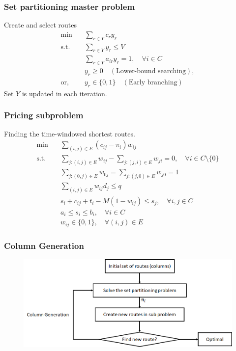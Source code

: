 \documentclass[10pt]{beamer}
\begin{document}
	\begin{frame}
		\frametitle{Set partitioning master problem}
		Create and select routes
		\begin{align*}
			\min \quad & \sum_{r \in Y} c_r y_r\\
			\text{s.t.} \quad & \sum_{r \in Y} y_r \le V\\
			& \sum_{r \in Y} a_{ir} y_r = 1, \quad \forall i \in C\\
			& y_r \ge 0 \quad (\text{Lower-bound searching}), \\
			\text{or}, \quad & y_r \in \{0, 1\} \quad (\text{Early branching})
		\end{align*}
		Set $Y$ is updated in each iteration.
	\end{frame}

	\begin{frame}
		\frametitle{Pricing subproblem}
		Finding the time-windowed shortest routes.
		\begin{align*}
			\min \quad & \sum_{(i, j) \in E} (c_{ij} - \pi_i) w_{ij}\\
			\text{s.t.} \quad & \sum_{j: (i, j) \in E} w_{ij} - \sum_{j:(j, i)\in E} w_{ji} = 0, \quad \forall i \in C \setminus \{0\}\\
			& \sum_{j: (0, j) \in E} w_{0j} = \sum_{j: (j, 0) \in E} w_{j0} = 1\\
			& \sum_{(i, j) \in E} w_{ij} d_{j} \le q \\
			& s_i + c_{ij} + t_i - M(1 - w_{ij}) \le s_j, \quad \forall i, j \in C\\
			& a_i \le s_i \le b_i, \quad \forall i \in C\\
			& w_{ij} \in \{0, 1\}, \quad \forall (i, j) \in E
		\end{align*}
	\end{frame}

	\begin{frame}
		\frametitle{Column Generation}
		\begin{figure}[!h]
			\centering
			\includegraphics[width=1\textwidth]{CG}
		\end{figure}
	\end{frame}
\end{document}
